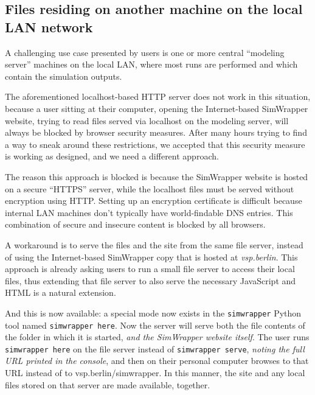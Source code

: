 \hypertarget{simwrapper-files-residing-on-another-machine-on-the-local-lan-network}{%
\subsection{Files residing on another machine on the local LAN network}\label{simwrapper-files-residing-on-another-machine-on-the-local-lan-network}}

A challenging use case presented by users is one or more central ``modeling server'' machines on the local LAN, where most runs are performed and which contain the simulation outputs.

The aforementioned localhost-based HTTP server does not work in this situation, because a user sitting at their computer, opening the Internet-based SimWrapper website, trying to read files served via localhost on the modeling server, will always be blocked by browser security measures. After many hours trying to find a way to sneak around these restrictions, we accepted that this security measure is working as designed, and we need a different approach.

The reason this approach is blocked is because the SimWrapper website is hosted on a secure ``HTTPS'' server, while the localhost files must be served without encryption using HTTP. Setting up an encryption certificate is difficult because internal LAN machines don't typically have world-findable DNS entries. This combination of secure and insecure content is blocked by all browsers.

A workaround is to serve the files and the site from the same file server, instead of using the Internet-based SimWrapper copy that is hosted at \emph{vsp.berlin}. This approach is already asking users to run a small file server to access their local files, thus extending that file server to also serve the necessary JavaScript and HTML is a natural extension.

And this is now available: a special mode now exists in the \texttt{simwrapper} Python tool named \texttt{simwrapper\ here}. Now the server will serve both the file contents of the folder in which it is started, \emph{and the SimWrapper website itself}. The user runs \texttt{simwrapper\ here} on the file server instead of \texttt{simwrapper\ serve}, \emph{noting the full URL printed in the console}, and then on their personal computer browses to that URL instead of to vsp.berlin/simwrapper. In this manner, the site and any local files stored on that server are made available, together.

